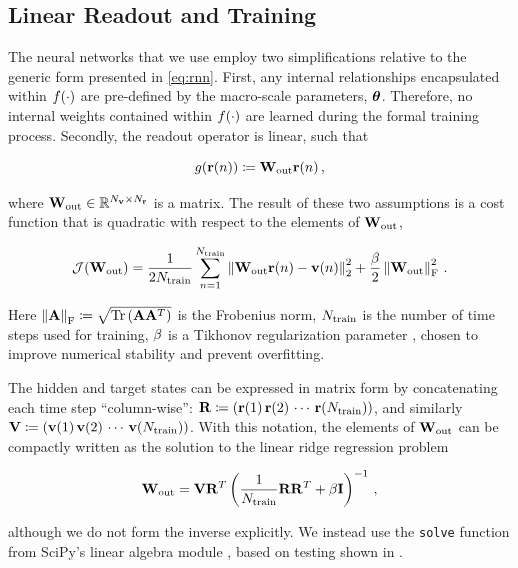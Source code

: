 \documentclass[draft]{agujournal2019}
\newcommand{\citep}{\cite}
\newcommand{\citet}{\citeA}
\begin{document}
\subsection{Linear Readout and Training}
\label{subsec:readout}

The neural networks that we use employ two
simplifications relative to the generic form presented in
\cref{eq:rnn}.
First, any internal relationships encapsulated within
$f(\cdot)$ are pre-defined by the macro-scale parameters,
$\bm{\theta}$.
Therefore, no internal weights contained within $f(\cdot)$
are learned during the formal training process.
Secondly, the readout operator is linear, such that
\begin{linenomath*}\begin{equation*}
    g(\mathbf{r}(n)) \coloneqq \mathbf{W}_\text{out} \mathbf{r}(n) \, ,
\end{equation*}\end{linenomath*}
where $\mathbf{W}_\text{out} \in \mathbb{R}^{N_{\mathbf{v}}\times N_{\mathbf{r}}}$ is a matrix.
The result of these two assumptions is a cost function that is quadratic with
respect to the elements of $\mathbf{W}_\text{out}$,
\begin{linenomath*}\begin{equation}
    \mathcal{J}(\mathbf{W}_\text{out}) =
        \dfrac{1}{2N_\text{train}}\sum_{n=1}^{N_\text{train}}
        \left\lVert\mathbf{W}_\text{out} \mathbf{r}(n) - \mathbf{v}(n)\right\rVert^2_2
        +
        \dfrac{\beta}{2}\left\lVert\mathbf{W}_\text{out}\right\rVert_\text{F}^2 \, .
    \label{eq:cost}
\end{equation}\end{linenomath*}
Here
$\left\lVert\mathbf{A}\right\rVert_\text{F} \coloneqq
\sqrt{\text{Tr}\left(\mathbf{A}\mathbf{A}^T\right)}$
is the Frobenius norm,
$N_\text{train}$ is the number of time steps used for training,
$\beta$ is a Tikhonov regularization parameter \citep{tikhonov_solution_1963}, chosen to improve
numerical stability and prevent overfitting.

The hidden and target states can be expressed in matrix form by concatenating
each time step ``column-wise'':
$\mathbf{R} \coloneqq (\mathbf{r}(1) \, \mathbf{r}(2) \, \cdots \, \mathbf{r}(N_\text{train}))$,
and similarly\\
\noindent$\mathbf{V} \coloneqq (\mathbf{v}(1) \, \mathbf{v}(2) \, \cdots \, \mathbf{v}(N_\text{train}))$.
With this notation, the elements of $\mathbf{W}_\text{out}$ can be compactly written as the
solution to the linear ridge regression problem
\begin{linenomath*}\begin{equation}
    \mathbf{W}_\text{out} = \mathbf{V} \mathbf{R}^T \left(\dfrac{1}{N_\text{train}}\mathbf{R}\mathbf{R}^T +
    \beta\mathbf{I}\right)^{-1} \, ,
    \label{eq:ridge_regression}
\end{equation}\end{linenomath*}
although we do not form the inverse explicitly.
We instead use the \texttt{solve} function from SciPy's linear algebra module
\citep{scipy_2020}, based on testing shown in
\citet<Appendix C of>[]{platt_systematic_2022}.
\end{document}
